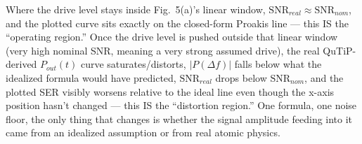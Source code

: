 \documentclass[11pt]{article}
\begin{document}
\begin{eqmeaning}
Where the drive level stays inside Fig.~5(a)'s linear window, $\text{SNR}_{real}\approx\text{SNR}_{nom}$, and the plotted curve sits exactly on the closed-form Proakis line --- this IS the ``operating region.'' Once the drive level is pushed outside that linear window (very high nominal SNR, meaning a very strong assumed drive), the real QuTiP-derived $P_{out}(t)$ curve saturates/distorts, $|P(\Delta f)|$ falls below what the idealized formula would have predicted, $\text{SNR}_{real}$ drops below $\text{SNR}_{nom}$, and the plotted SER visibly worsens relative to the ideal line even though the x-axis position hasn't changed --- this IS the ``distortion region.'' One formula, one noise floor, the only thing that changes is whether the signal amplitude feeding into it came from an idealized assumption or from real atomic physics.
\end{eqmeaning}
\end{document}
